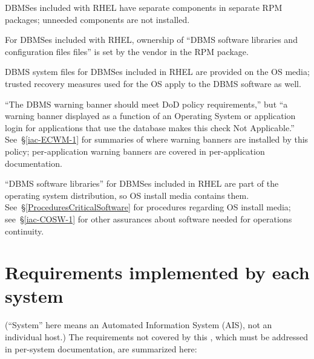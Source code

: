 %
DBMSes included with RHEL have separate components in separate RPM
packages; unneeded components are not installed.

%
For DBMSes included with RHEL, ownership of ``DBMS software libraries and
configuration files files'' is set by the vendor in the RPM package.

%
DBMS system files for DBMSes included in RHEL are provided on the OS
media; trusted recovery measures used for the OS apply to the DBMS
software as well.

%
``The DBMS warning banner should meet DoD policy requirements,'' but ``a
warning banner displayed as a function of an Operating System or
application login for applications that use the database makes this check
Not Applicable.'' See~\S\ref{iac-ECWM-1} for summaries of where warning
banners are installed by this policy; per-application warning banners are
covered in per-application documentation.

%
``DBMS software libraries'' for DBMSes included in RHEL are part of the
operating system distribution, so OS install media contains them.
See~\S\ref{ProceduresCriticalSoftware} for procedures regarding OS install
media; see~\S\ref{iac-COSW-1} for other assurances about software needed
for operations continuity.






\section{Requirements implemented by each system}
\label{per-system-databasestig}

(``System'' here means an Automated Information System (AIS), not an
individual host.) The requirements not covered by this \CMITSPolicy ,
which must be addressed in per-system documentation, are summarized here:

